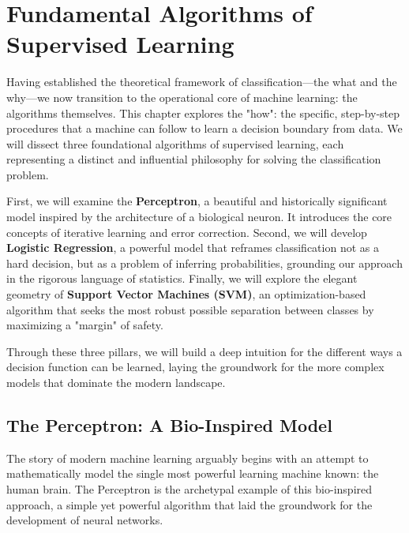 \chapter{Fundamental Algorithms of Supervised Learning}
\label{chap:supervised_algorithms}

Having established the theoretical framework of classification—the what and the why—we now transition to the operational core of machine learning: the algorithms themselves. This chapter explores the "how": the specific, step-by-step procedures that a machine can follow to learn a decision boundary from data. We will dissect three foundational algorithms of supervised learning, each representing a distinct and influential philosophy for solving the classification problem.

First, we will examine the \textbf{Perceptron}, a beautiful and historically significant model inspired by the architecture of a biological neuron. It introduces the core concepts of iterative learning and error correction. Second, we will develop \textbf{Logistic Regression}, a powerful model that reframes classification not as a hard decision, but as a problem of inferring probabilities, grounding our approach in the rigorous language of statistics. Finally, we will explore the elegant geometry of \textbf{Support Vector Machines (SVM)}, an optimization-based algorithm that seeks the most robust possible separation between classes by maximizing a "margin" of safety.

Through these three pillars, we will build a deep intuition for the different ways a decision function can be learned, laying the groundwork for the more complex models that dominate the modern landscape.

\section{The Perceptron: A Bio-Inspired Model}
\label{sec:perceptron}
The story of modern machine learning arguably begins with an attempt to mathematically model the single most powerful learning machine known: the human brain. The Perceptron is the archetypal example of this bio-inspired approach, a simple yet powerful algorithm that laid the groundwork for the development of neural networks.

